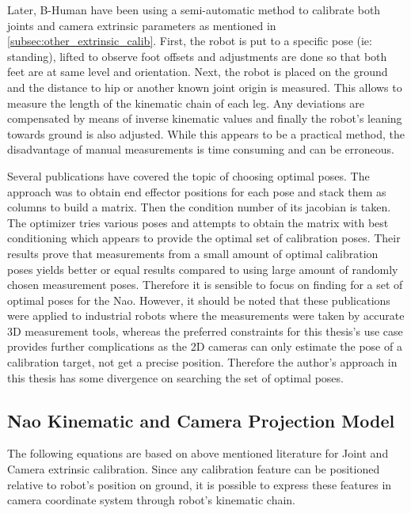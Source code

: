 \documentclass[english, printversion, nomenclature, notitle]{tuvisionthesis} %
\makeatletter
\renewcommand{\todo}[2][]{\tikzexternaldisable\@todo[#1]{#2}\tikzexternalenable}
\makeatother
\begin{document}
Later, B-Human have been using a semi-automatic method to calibrate both joints and camera extrinsic parameters as mentioned in \cref{subsec:other_extrinsic_calib}. First, the robot is put to a specific pose (ie: standing), lifted to observe foot offsets and adjustments are done so that both feet are at same level and orientation. Next, the robot is placed on the ground and the distance to hip or another known joint origin is measured. This allows to measure the length of the kinematic chain of each leg. Any deviations are compensated by means of inverse kinematic values and finally the robot's leaning towards ground is also adjusted. While this appears to be a practical method, the disadvantage of manual measurements is time consuming and can be erroneous. 

Several publications have covered the topic of choosing optimal poses. The approach was to obtain end effector positions for each pose and stack them as columns to build a matrix. Then the condition number of its jacobian is taken. The optimizer tries various poses and attempts to obtain the matrix with best conditioning which appears to provide the optimal set of calibration poses. Their results prove that measurements from a small amount of optimal calibration poses yields better or equal results compared to using large amount of randomly chosen measurement poses. Therefore it is sensible to focus on finding for a set of optimal poses for the Nao. However, it should be noted that these publications were applied to industrial robots where the measurements were taken by accurate 3D measurement tools, whereas the preferred constraints for this thesis's use case provides further complications as the 2D cameras can only estimate the pose of a calibration target, not get a precise position. Therefore the author's approach in this thesis has some divergence on searching the set of optimal poses.

\subsection{Nao Kinematic and Camera Projection Model}

The following equations are based on above mentioned literature for Joint and Camera extrinsic calibration. Since any calibration feature can be positioned relative to robot's position on ground, it is possible to express these features in camera coordinate system through robot's kinematic chain.

\todo{ put equations}
\end{document}
